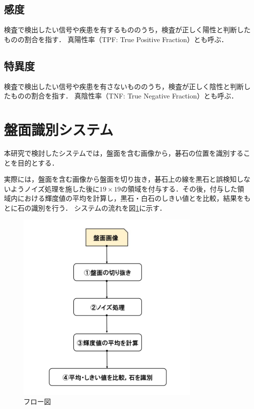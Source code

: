 \documentclass[openright]{nitocs}
\numberwithin{equation}{section}
\begin{document}
        \subsection{感度} %
        検査で検出したい信号や疾患を有するもののうち，検査が正しく陽性と判断したものの割合を指す．
        真陽性率（TPF: True Positive Fraction）とも呼ぶ．

        \subsection{特異度} %
        検査で検出したい信号や疾患を有さないもののうち，検査が正しく陰性と判断したものの割合を指す．
        真陰性率（TNF: True Negative Fraction）とも呼ぶ．

    \section{盤面識別システム} %
        本研究で検討したシステムでは，盤面を含む画像から，碁石の位置を識別することを目的とする．

        実際には，盤面を含む画像から盤面を切り抜き，碁石上の線を黒石と誤検知しないようノイズ処理を施した後に$19\times19$の領域を付与する．その後，付与した領域内における輝度値の平均を計算し，黒石・白石のしきい値とを比較，結果をもとに石の識別を行う．
        システムの流れを図\ref{flow}に示す．
        \begin{figure}[tb] %
            \begin{center}
            \includegraphics[clip,width=90mm]{flow.jpg} 
            \caption{フロー図}
            \label{flow}
            \end{center}
        \end{figure}
\end{document}
